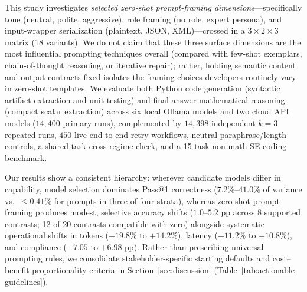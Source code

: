 \documentclass[a4paper,fleqn]{cas-sc}
\begin{document}
    This study investigates \emph{selected zero-shot prompt-framing dimensions}—specifically tone (neutral, polite, aggressive), role framing (no role, expert persona), and input-wrapper serialization (plaintext, JSON, XML)—crossed in a $3 \times 2 \times 3$ matrix (18 variants). We do not claim that these three surface dimensions are the most influential prompting techniques overall (compared with few-shot exemplars, chain-of-thought reasoning, or iterative repair); rather, holding semantic content and output contracts fixed isolates the framing choices developers routinely vary in zero-shot templates. We evaluate both Python code generation (syntactic artifact extraction and unit testing) and final-answer mathematical reasoning (compact scalar extraction) across six local Ollama models and two cloud API models ($14{,}400$ primary runs), complemented by $14{,}398$ independent $k = 3$ repeated runs, $450$ live end-to-end retry workflows, neutral paraphrase/length controls, a shared-task cross-regime check, and a 15-task non-math SE coding benchmark.

    Our results show a consistent hierarchy: wherever candidate models differ in capability, model selection dominates Pass@1 correctness ($7.2\%$--$41.0\%$ of variance vs.\ $\le 0.41\%$ for prompts in three of four strata), whereas zero-shot prompt framing produces modest, selective accuracy shifts ($1.0$--$5.2$ pp across 8 supported contrasts; 12 of 20 contrasts compatible with zero) alongside systematic operational shifts in tokens ($-19.8\%$ to $+14.2\%$), latency ($-11.2\%$ to $+10.8\%$), and compliance ($-7.05$ to $+6.98$ pp). Rather than prescribing universal prompting rules, we consolidate stakeholder-specific starting defaults and cost--benefit proportionality criteria in Section~\ref{sec:discussion} (Table~\ref{tab:actionable-guidelines}).
\end{document}
